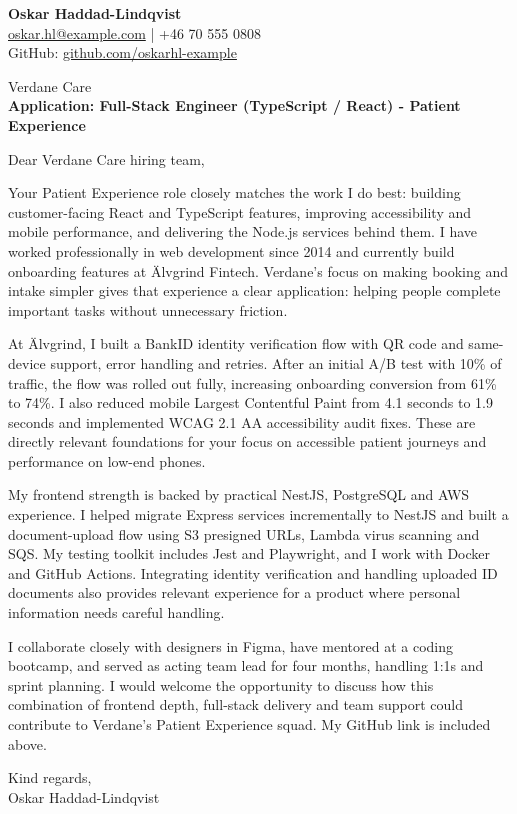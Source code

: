 \documentclass[11pt,a4paper]{article}
\begin{document}
{\Large\bfseries\color{primarycolor} Oskar Haddad-Lindqvist}\\
\href{mailto:oskar.hl@example.com}{oskar.hl@example.com} | +46 70 555 0808\\
GitHub: \href{https://github.com/oskarhl-example}{github.com/oskarhl-example}

Verdane Care\\
\textbf{Application: Full-Stack Engineer (TypeScript / React) - Patient Experience}

Dear Verdane Care hiring team,

Your Patient Experience role closely matches the work I do best: building customer-facing React and TypeScript features, improving accessibility and mobile performance, and delivering the Node.js services behind them. I have worked professionally in web development since 2014 and currently build onboarding features at Älvgrind Fintech. Verdane's focus on making booking and intake simpler gives that experience a clear application: helping people complete important tasks without unnecessary friction.

At Älvgrind, I built a BankID identity verification flow with QR code and same-device support, error handling and retries. After an initial A/B test with 10\% of traffic, the flow was rolled out fully, increasing onboarding conversion from 61\% to 74\%. I also reduced mobile Largest Contentful Paint from 4.1 seconds to 1.9 seconds and implemented WCAG 2.1 AA accessibility audit fixes. These are directly relevant foundations for your focus on accessible patient journeys and performance on low-end phones.

My frontend strength is backed by practical NestJS, PostgreSQL and AWS experience. I helped migrate Express services incrementally to NestJS and built a document-upload flow using S3 presigned URLs, Lambda virus scanning and SQS. My testing toolkit includes Jest and Playwright, and I work with Docker and GitHub Actions. Integrating identity verification and handling uploaded ID documents also provides relevant experience for a product where personal information needs careful handling.

I collaborate closely with designers in Figma, have mentored at a coding bootcamp, and served as acting team lead for four months, handling 1:1s and sprint planning. I would welcome the opportunity to discuss how this combination of frontend depth, full-stack delivery and team support could contribute to Verdane's Patient Experience squad. My GitHub link is included above.

Kind regards,\\
Oskar Haddad-Lindqvist
\end{document}
